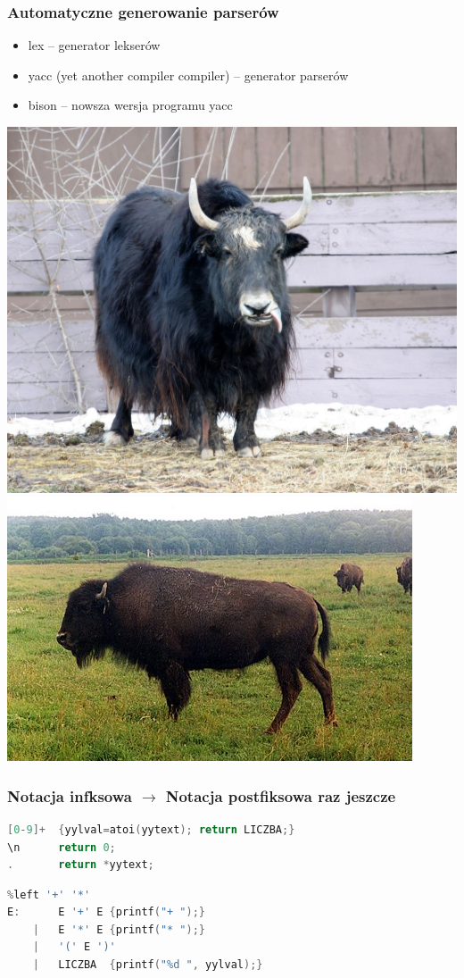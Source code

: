 \documentclass{beamer}
\begin{document}
	
	\begin{frame}
		\frametitle{Automatyczne generowanie parserów}
		\begin{itemize}
			\item lex -- generator lekserów
			\item yacc (yet another compiler compiler) -- generator parserów
			\item bison -- nowsza wersja programu yacc
		\end{itemize}
		\pause
		\includegraphics[height=.4\textheight]{jak.jpg}
		\includegraphics[height=.4\textheight]{bizon.jpg}
	\end{frame}
	
	\begin{frame}[fragile]
		\frametitle{Notacja infksowa $\rightarrow$ Notacja postfiksowa raz jeszcze}
		\center{lex}
		\begin{lstlisting}[language=c]
[0-9]+  {yylval=atoi(yytext); return LICZBA;}
\n      return 0;
.       return *yytext;
		\end{lstlisting}
		\pause
		\center{yacc}
		\begin{lstlisting}[language=c]
%token LICZBA
%left '+' '*'
E:  	E '+' E {printf("+ ");}
	|	E '*' E {printf("* ");}
	|	'(' E ')'
	|	LICZBA	{printf("%d ", yylval);}
		\end{lstlisting}

	\end{frame}
	
\end{document}
